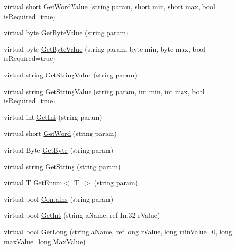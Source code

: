\begin{DoxyCompactItemize}
virtual short \mbox{\hyperlink{class_t_net_1_1_service_1_1_action_getter_aebb2cb19e051911824a3b6c747904bdd}{Get\+Word\+Value}} (string param, short min, short max, bool is\+Required=true)
\item 
virtual byte \mbox{\hyperlink{class_t_net_1_1_service_1_1_action_getter_a3b6b4ef30e7a8ba8d39a1cec87eae4d1}{Get\+Byte\+Value}} (string param)
\item 
virtual byte \mbox{\hyperlink{class_t_net_1_1_service_1_1_action_getter_a8eaa7a6f8762849c0d881d9aad835219}{Get\+Byte\+Value}} (string param, byte min, byte max, bool is\+Required=true)
\item 
virtual string \mbox{\hyperlink{class_t_net_1_1_service_1_1_action_getter_a35e4f3f9255c3fdb020839d30d8e7e22}{Get\+String\+Value}} (string param)
\item 
virtual string \mbox{\hyperlink{class_t_net_1_1_service_1_1_action_getter_a9e6191c6c968b4f7a106ed638f599c36}{Get\+String\+Value}} (string param, int min, int max, bool is\+Required=true)
\item 
virtual int \mbox{\hyperlink{class_t_net_1_1_service_1_1_action_getter_a1aee020aa39f0a8bdfc46d44ac43219b}{Get\+Int}} (string param)
\item 
virtual short \mbox{\hyperlink{class_t_net_1_1_service_1_1_action_getter_a38f3f98294b26f2d4b4a281db0550e52}{Get\+Word}} (string param)
\item 
virtual Byte \mbox{\hyperlink{class_t_net_1_1_service_1_1_action_getter_aba2682659a54a8750b520f9f00fe9961}{Get\+Byte}} (string param)
\item 
virtual string \mbox{\hyperlink{class_t_net_1_1_service_1_1_action_getter_abe969bc31489bbeff2c777a971fdb760}{Get\+String}} (string param)
\item 
virtual T \mbox{\hyperlink{class_t_net_1_1_service_1_1_action_getter_aa31cf64fa46ebe6448abb26ed271c15b}{Get\+Enum$<$ T $>$}} (string param)
\item 
virtual bool \mbox{\hyperlink{class_t_net_1_1_service_1_1_action_getter_a9a1e277743b2cc5c2a8e9485e16a0060}{Contains}} (string param)
\item 
virtual bool \mbox{\hyperlink{class_t_net_1_1_service_1_1_action_getter_a9bd24ed11677a2ea2a872a429d083e01}{Get\+Int}} (string a\+Name, ref Int32 r\+Value)
\item 
virtual bool \mbox{\hyperlink{class_t_net_1_1_service_1_1_action_getter_aeb35984a4c45e670f876bea9cb450563}{Get\+Long}} (string a\+Name, ref long r\+Value, long min\+Value=0, long max\+Value=long.\+Max\+Value)
\item 

\end{DoxyCompactItemize}
